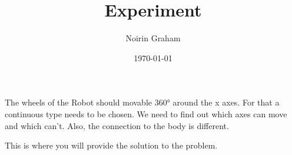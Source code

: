 \documentclass{article}
\title{Experiment}
\author{Noirin Graham}
\date{\today}
\begin{document}
\maketitle

\begin{problembox}
The wheels of the Robot should movable 360° around the x axes. For that a continuous type needs to be chosen. We need to find out which axes can move and which can't. Also, the connection to the body is different.
\end{problembox}

\begin{solutionbox}
This is where you will provide the solution to the problem.
\end{solutionbox}
\end{document}
